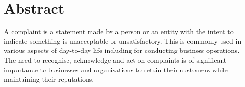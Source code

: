\chapter*{\Large \center Abstract}

A complaint is a statement made by a person or an entity with the intent to indicate something is unacceptable or unsatisfactory. This is commonly used in various aspects of day-to-day life including for conducting business operations. The need to recognise, acknowledge and act on complaints is of significant importance to businesses and organisations to retain their customers while maintaining their reputations.